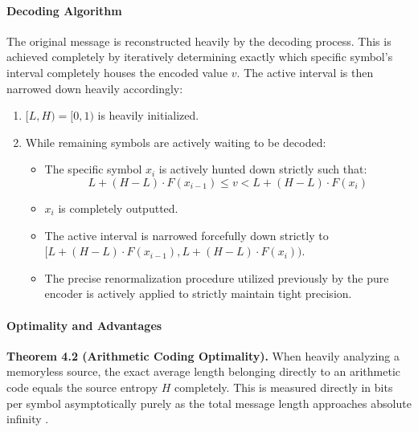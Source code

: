 \paragraph{Decoding Algorithm}

The original message is reconstructed heavily by the decoding process. This is achieved completely by iteratively determining exactly which specific symbol's interval completely houses the encoded value $v$. The active interval is then narrowed down heavily accordingly:

\begin{enumerate}
    \item $[L, H) = [0, 1)$ is heavily initialized.
    \item While remaining symbols are actively waiting to be decoded:
    \begin{itemize}
        \item The specific symbol $x_i$ is actively hunted down strictly such that:
        \begin{equation}
            L + (H-L) \cdot F(x_{i-1}) \leq v < L + (H-L) \cdot F(x_i)
        \end{equation}
        \item $x_i$ is completely outputted.
        \item The active interval is narrowed forcefully down strictly to $[L + (H-L) \cdot F(x_{i-1}), L + (H-L) \cdot F(x_i))$.
        \item The precise renormalization procedure utilized previously by the pure encoder is actively applied to strictly maintain tight precision.
    \end{itemize}
\end{enumerate}

\paragraph{Optimality and Advantages}

\vspace{0.5em}\noindent
\textbf{Theorem 4.2 (Arithmetic Coding Optimality).} When heavily analyzing a memoryless source, the exact average length belonging directly to an arithmetic code equals the source entropy $H$ completely. This is measured directly in bits per symbol asymptotically purely as the total message length approaches absolute infinity \cite{Huffman1952}.

